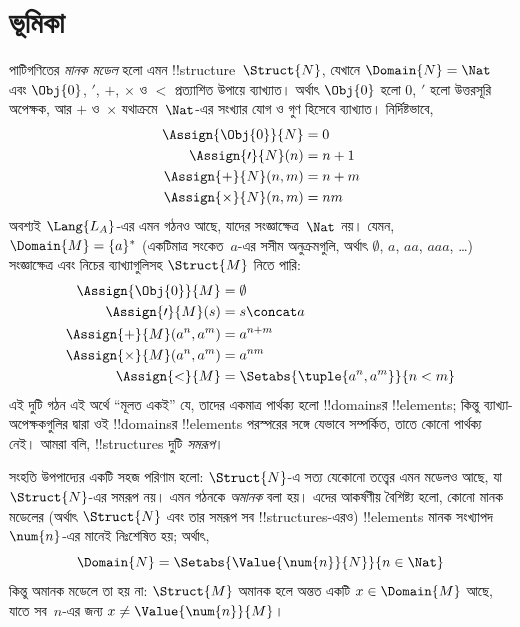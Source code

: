 \documentclass[../../../include/open-logic-section]{subfiles}
\begin{document}
\section{ভূমিকা}

পাটিগণিতের \emph{মানক মডেল} হলো এমন !!{structure}~$\Struct{N}$,
যেখানে $\Domain{N} = \Nat$ এবং $\Obj{0}$, $\prime$, $+$, $\times$ ও
$<$ প্রত্যাশিত উপায়ে ব্যাখ্যাত। অর্থাৎ $\Obj{0}$ হলো $0$, $\prime$
হলো উত্তরসূরি অপেক্ষক, আর $+$ ও~$\times$ যথাক্রমে~$\Nat$-এর সংখ্যার
যোগ ও গুণ হিসেবে ব্যাখ্যাত। নির্দিষ্টভাবে,
\begin{align*}
  \Assign{\Obj{0}}{N} & = 0\\
  \Assign{\prime}{N}(n) & = n + 1\\
  \Assign{+}{N}(n, m) & = n + m\\
  \Assign{\times}{N}(n, m) & = nm
\end{align*}
অবশ্যই $\Lang{L_A}$-এর এমন গঠনও আছে, যাদের সংজ্ঞাক্ষেত্র~$\Nat$
নয়। যেমন, $\Domain{M} = \{a\}^*$ (একটিমাত্র সংকেত~$a$-এর সসীম
অনুক্রমগুলি, অর্থাৎ $\emptyset$, $a$, $aa$, $aaa$, \dots) সংজ্ঞাক্ষেত্র
এবং নিচের ব্যাখ্যাগুলিসহ $\Struct{M}$ নিতে পারি:
\begin{align*}
  \Assign{\Obj{0}}{M} & = \emptyset\\
  \Assign{\prime}{M}(s) & = s \concat a\\
  \Assign{+}{M}(a^n, a^m) & = a^{n + m}\\
  \Assign{\times}{M}(a^n, a^m) & = a^{nm}\\
  \Assign{<}{M} & = \Setabs{\tuple{a^n,a^m}}{n<m}
\end{align*}
এই দুটি গঠন এই অর্থে ``মূলত একই'' যে, তাদের একমাত্র পার্থক্য হলো
!!{domain}sর !!{element}s; কিন্তু ব্যাখ্যা-অপেক্ষকগুলির দ্বারা ওই
!!{domain}sর !!{element}s পরস্পরের সঙ্গে যেভাবে সম্পর্কিত, তাতে কোনো
পার্থক্য নেই। আমরা বলি, !!{structure}s দুটি \emph{সমরূপ}।

সংহতি উপপাদ্যের একটি সহজ পরিণাম হলো: $\Struct{N}$-এ সত্য যেকোনো
তত্ত্বের এমন মডেলও আছে, যা $\Struct{N}$-এর সমরূপ নয়। এমন গঠনকে
\emph{অমানক} বলা হয়। এদের আকর্ষণীয় বৈশিষ্ট্য হলো, কোনো মানক মডেলের
(অর্থাৎ $\Struct{N}$ এবং তার সমরূপ সব !!{structure}s-এরও) !!{element}s
মানক সংখ্যাপদ~$\num{n}$-এর মানেই নিঃশেষিত হয়; অর্থাৎ,
\[
\Domain{N} = \Setabs{\Value{\num{n}}{N}}{n \in \Nat}
\]
কিন্তু অমানক মডেলে তা হয় না: $\Struct{M}$ অমানক হলে অন্তত একটি
$x \in \Domain{M}$ আছে, যাতে সব~$n$-এর জন্য
$x \neq \Value{\num{n}}{M}$।
\end{document}

